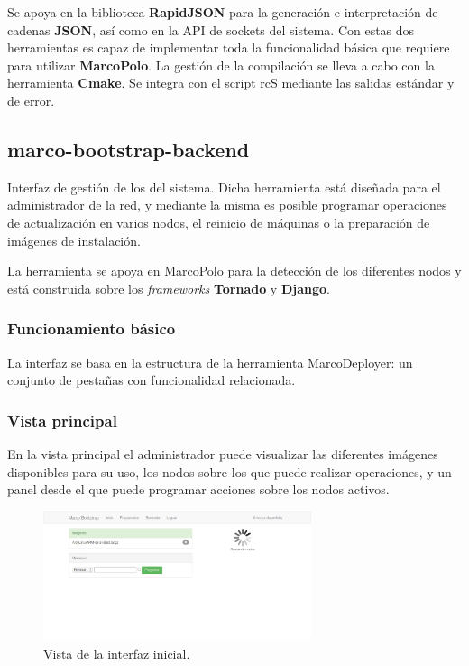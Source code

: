 \documentclass{article}
\begin{document}
Se apoya en la biblioteca \textbf{RapidJSON} para la generación e interpretación de cadenas \textbf{JSON}, así como en la API de sockets del sistema. Con estas dos herramientas es capaz de implementar toda la funcionalidad básica que requiere para utilizar \textbf{MarcoPolo}. La gestión de la compilación se lleva a cabo con la herramienta \textbf{Cmake}. Se integra con el script rcS mediante las salidas estándar y de error.

\subsection{marco-bootstrap-backend}

Interfaz de gestión de los del sistema. Dicha herramienta está diseñada para el administrador de la red, y mediante la misma es posible programar operaciones de actualización en varios nodos, el reinicio de máquinas o la preparación de imágenes de instalación.

La herramienta se apoya en MarcoPolo para la detección de los diferentes nodos y está construida sobre los \textit{frameworks} \textbf{Tornado} y \textbf{Django}.

\subsubsection{Funcionamiento básico}

La interfaz se basa en la estructura de la herramienta MarcoDeployer: un conjunto de pestañas con funcionalidad relacionada.

\subsubsection{Vista principal}

En la vista principal el administrador puede visualizar las diferentes imágenes disponibles para su uso, los nodos sobre los que puede realizar operaciones, y un panel desde el que puede programar acciones sobre los nodos activos.

\begin{figure}[H]
\centering
\includegraphics[width=0.7\textwidth]{index}
\caption{Vista de la interfaz inicial.}
\label{backend:index}
\end{figure}
\end{document}
